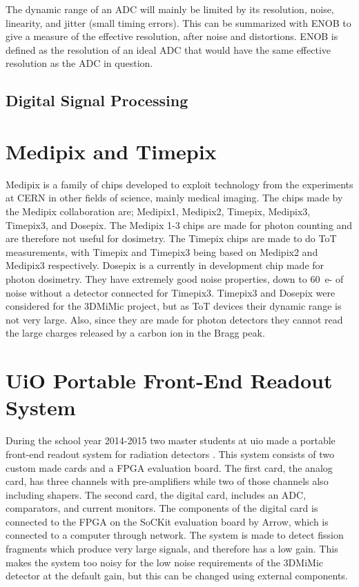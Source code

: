 \documentclass[../main/thesis.tex]{subfiles}
\begin{document}
The dynamic range of an \gls{ADC} will mainly be limited by its resolution, noise, linearity, and jitter (small timing errors). This can be summarized with \gls{ENOB} to give a measure of the effective resolution, after noise and distortions. \gls{ENOB} is defined as the resolution of an ideal \gls{ADC} that would have the same effective resolution as the \gls{ADC} in question.

\subsection{Digital Signal Processing}
\label{t-dsp}


\section{Medipix and Timepix}
\label{e-medipix}
Medipix is a family of chips developed to exploit technology from the experiments at CERN in other fields of science, mainly medical imaging. The chips made by the Medipix collaboration are; Medipix1, Medipix2, Timepix, Medipix3, Timepix3, and Dosepix. The Medipix 1-3 chips are made for photon counting and are therefore not useful for dosimetry. The Timepix chips are made to do \gls{ToT} measurements, with Timepix and Timepix3 being based on Medipix2 and Medipix3 respectively. Dosepix is a currently in development chip made for photon dosimetry. They have extremely good noise properties, down to 60~e- of noise without a detector connected for Timepix3. Timepix3 and Dosepix were considered for the 3DMiMic project, but as \gls{ToT} devices their dynamic range is not very large. Also, since they are made for photon detectors they cannot read the large charges released by a carbon ion in the Bragg peak. 

\section{UiO Portable Front-End Readout System}
\label{e-uio}
During the school year 2014-2015 two master students at \gls{uio} made a portable front-end readout system for radiation detectors \citep{tali} \citep{oltedal}. This system consists of two custom made cards and a \gls{FPGA} evaluation board. The first card, the analog card, has three channels with pre-amplifiers while two of those channels also including shapers. The second card, the digital card, includes an \gls{ADC}, comparators, and current monitors. The components of the digital card is connected to the \gls{FPGA} on the SoCKit evaluation board by Arrow, which is connected to a computer through network. The system is made to detect fission fragments which produce very large signals, and therefore has a low gain. This makes the system too noisy for the low noise requirements of the 3DMiMic detector at the default gain, but this can be changed using external components.
\end{document}
